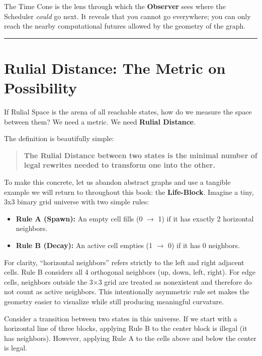 The Time Cone is the lens through which the \textbf{Observer} sees where the Scheduler \textit{could} go next. It reveals that you cannot go everywhere; you can only reach the nearby computational futures allowed by the geometry of the graph.

\begin{center}
\rule{0.5\linewidth}{0.5pt}
\end{center}

\section{Rulial Distance: The Metric on Possibility}
\label{rulial-distance-the-metric-on-possibility}

If Rulial Space is the arena of all reachable states, how do we measure the space between them? We need a metric. We need \textbf{Rulial Distance}.

The definition is beautifully simple:

\begin{quote}
\textbf{The Rulial Distance between two states is the minimal number of legal rewrites needed to transform one into the other.}
\end{quote}

To make this concrete, let us abandon abstract graphs and use a tangible example we will return to throughout this book: the \textbf{Life-Block}. Imagine a tiny, 3x3 binary grid universe with two simple rules:

\begin{itemize}
    \item \textbf{Rule A (Spawn):} An empty cell fills (0 $\to$ 1) if it has exactly 2 horizontal neighbors.
    \item \textbf{Rule B (Decay):} An active cell empties (1 $\to$ 0) if it has 0 neighbors.
\end{itemize}

For clarity, ``horizontal neighbors'' refers strictly to the left and right adjacent cells. Rule B considers all 4 orthogonal neighbors (up, down, left, right). For edge cells, neighbors outside the 3×3 grid are treated as nonexistent and therefore do not count as active neighbors. This intentionally asymmetric rule set makes the geometry easier to visualize while still producing meaningful curvature.

Consider a transition between two states in this universe. If we start with a horizontal line of three blocks, applying Rule B to the center block is illegal (it has neighbors). However, applying Rule A to the cells above and below the center is legal.

